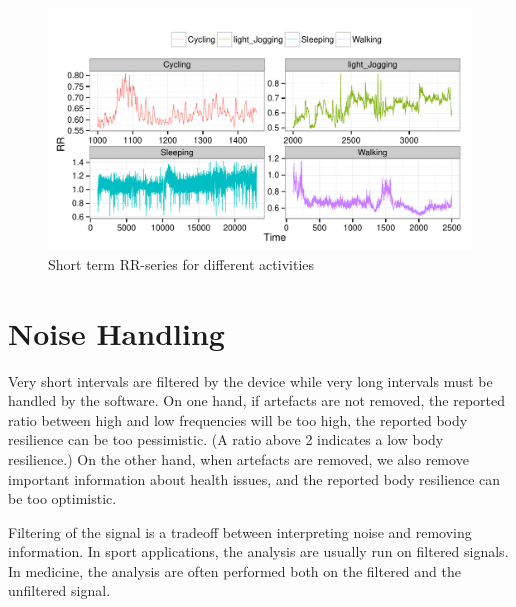 \documentclass[a4paper, 11pt]{report}\usepackage[]{graphicx}\usepackage[]{color}
\makeatletter
\def\maxwidth{ %
  \ifdim\Gin@nat@width>\linewidth
    \linewidth
  \else
    \Gin@nat@width
  \fi
}
\newenvironment{knitrout}{}{} %
\numberwithin{figure}{section}
\makeatother
\begin{document}
\begin{knitrout}
\color{fgcolor}\begin{figure}[H]
\includegraphics[width=\maxwidth]{figure/st_rrPlot-1} \caption[Short term RR-series for different activities]{Short term RR-series for different activities}\label{fig:st.rrPlot}
\end{figure}


\end{knitrout}
\section{Noise Handling}
Very short intervals are filtered by the device while very long intervals must be handled by the software. On one hand, if artefacts are not removed, the reported ratio between high and low frequencies will be too high, the reported body resilience can be too pessimistic. (A ratio above 2 indicates a low body resilience.) On the other hand, when artefacts are removed, we also remove important information about health issues, and the reported body resilience can be too optimistic.

Filtering of the signal is a tradeoff between interpreting noise and removing information. In sport applications, the analysis are usually run on filtered signals. In medicine, the analysis are often performed both on the filtered and the unfiltered signal.
\end{document}
